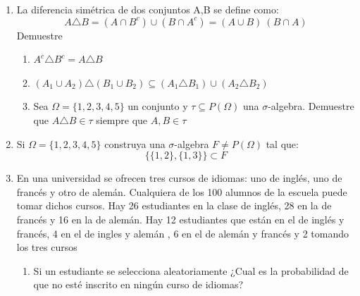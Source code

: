 \documentclass[12pt,a4paper]{report}
\begin{document}
\begin{enumerate}
   \item {
  La diferencia simétrica de dos conjuntos A,B se define como:\\

		$$A\triangle B = (A \cap B^c)\cup (B \cap A^c)=(A \cup B)\ (B \cap A)$$
Demuestre
\begin{enumerate}[label=\alph*) ]
	\item{$A^c \triangle B^c = A \triangle B $ \\

	}

	\item{$ (A_{1} \cup A_{2})\triangle (B_{1} \cup B_{2})\subseteq (A_{1} \triangle B_{1}) \cup (A_{2} \triangle B_{2}) $ \\

	}

	\item{Sea $\Omega = \lbrace 1,2,3,4,5 \rbrace  $ un conjunto y $\tau \subseteq P(\Omega)$ una $\sigma$-algebra. Demuestre que $A \triangle B \in \tau $ siempre que $A,B \in \tau $ \\

	}



\end{enumerate}

	}

   \item {
    Si $\Omega = \lbrace 1,2,3,4,5 \rbrace$ construya una $\sigma$-algebra $F \neq P(\Omega)$ tal que:\\
    $$\lbrace \lbrace 1,2 \rbrace , \lbrace 1,3 \rbrace \rbrace \subset F$$

	}


   \item {
   En una universidad se ofrecen tres cursos de idiomas: uno  de inglés, uno de francés y otro de alemán. Cualquiera de los 100 alumnos de la escuela puede tomar dichos cursos. Hay 26 estudiantes en la clase de inglés, 28 en la de francés y 16 en la de alemán. Hay 12 estudiantes que están en el de inglés y francés, 4 en el de ingles y alemán , 6 en el de alemán y francés y 2 tomando los tres cursos\\

	\begin{enumerate}[label=\alph*) ]
   \item {
	Si un estudiante se selecciona aleatoriamente ¿Cual es la probabilidad de que no esté inscrito en ningún curso de idiomas?\\


}
\end{enumerate}}
\end{enumerate}
\end{document}
